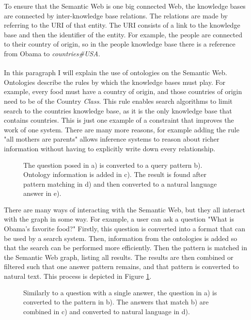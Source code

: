 \documentclass{article}
\begin{document}
 To ensure that the Semantic Web is one big connected Web, the knowledge bases are connected by inter-knowledge base relations. The relations are made by referring to the URI of that entity. The URI consists of a link to the knowledge base and then the identifier of the entity. For example, the people are connected to their country of origin, so in the people knowledge base there is a reference from Obama to \emph{countries\#USA}.
 \paragraph{}
 In this paragraph I will explain the use of ontologies on the Semantic Web. Ontologies describe the rules by which the knowledge bases must play. For example, every food must have a country of origin, and those countries of origin need to be of the Country \emph{Class}. This rule enables search algorithms to limit search to the countries knowledge base, as it is the only knowledge base that contains countries\cite{whyontologies}. This is just one example of a constraint that improves the work of one system. There are many more reasons, for example adding the rule "all mothers are parents" allows inference systems to reason about richer information without having to explicitly write down every relationship.
 
 \begin{figure}[H]
 \centering
 \caption[Graph question example]{The question posed in a) is converted to a query pattern b). Ontology information is added in c). The result is found after pattern matching in d) and then converted to a natural language answer in e).}
 \label{question_graph}
 \end{figure}
 
 There are many ways of interacting with the Semantic Web, but they all interact with the graph in some way. For example, a user can ask a question "What is Obama's favorite food?" Firstly, this question is converted into a format that can be used by a search system. Then, information from the ontologies is added so that the search can be performed more efficiently. Then the pattern is matched in the Semantic Web graph, listing all results. The results are then combined or filtered such that one answer pattern remains, and that pattern is converted to natural text. This process is depicted in Figure \ref{question_graph}.

 \begin{figure}[H]
 \centering
 \caption[Graph biography example]{Similarly to a question with a single answer, the question in a) is converted to the pattern in b). The answers that match b) are combined in c) and converted to natural language in d).}
 \label{question_graph2}
 \end{figure}
 
\end{document}
